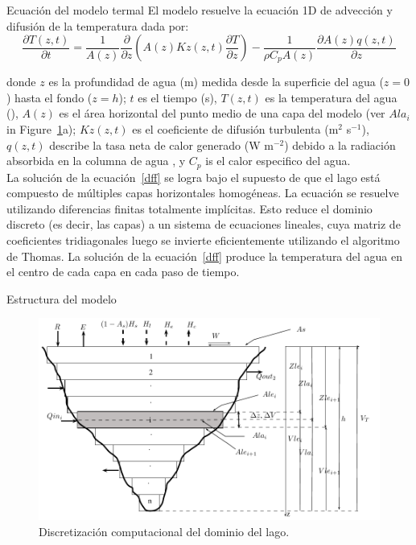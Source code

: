 \documentclass[
10pt,
aspectratio=169,
]{beamer}
\begin{document}
\begin{frame}{Ecuaci\'on del modelo termal}
El modelo resuelve la ecuación 1D de advecci\'on y difusión de la temperatura dada por:
\begin{equation}
 \frac{\partial T(z,t)}{\partial t}  =  \frac{1}{A(z)}\frac{\partial}{\partial z}(A(z)Kz(z,t)\frac{\partial T}{\partial z}) - \frac{1}{\rho C_p A(z)} \frac{\partial A(z)q(z,t)}{\partial z}
 \label{dff}
\end{equation}

donde  $z$ es la profundidad de agua (m) medida desde la superficie del agua ($z = 0$) hasta el fondo ($z = h$); $t$ es el tiempo (s), $T(z,t)$ es la temperatura del agua (), $A(z)$ es el área horizontal del punto medio de una capa del modelo (ver $Ala_i$ in Figure~\ref{uclakeStruc}a); $Kz(z,t)$ es el coeficiente de difusión turbulenta (m$^2$ s$^{-1}$), $q(z,t)$ describe la tasa neta de calor generado  (W m$^{-2}$) debido a  la radiación absorbida en la columna de agua , y $C_p$ is el calor especifico del agua.\\ 

La solución de la ecuación~\ref{dff} se logra bajo el supuesto de que el lago está compuesto de múltiples capas horizontales homogéneas. La ecuación se resuelve utilizando diferencias finitas totalmente implícitas. Esto reduce el dominio discreto (es decir, las capas) a un sistema de ecuaciones lineales, cuya matriz de coeficientes tridiagonales luego se invierte eficientemente utilizando el algoritmo de Thomas. La solución de la ecuación~\ref{dff} produce la temperatura del agua en el centro de cada capa en cada paso de tiempo.
\end{frame}

\begin{frame}{Estructura del modelo}
\vspace{-0.3cm}
\begin{figure}[!htbp]
  \begin{center}
    \includegraphics[height=0.8\textheight]{uclakeStruc.pdf}
    \caption{Discretizaci\'on computacional del dominio del lago.}
    \label{uclakeStruc}
  \end{center}
\end{figure}
\end{frame}
\end{document}
